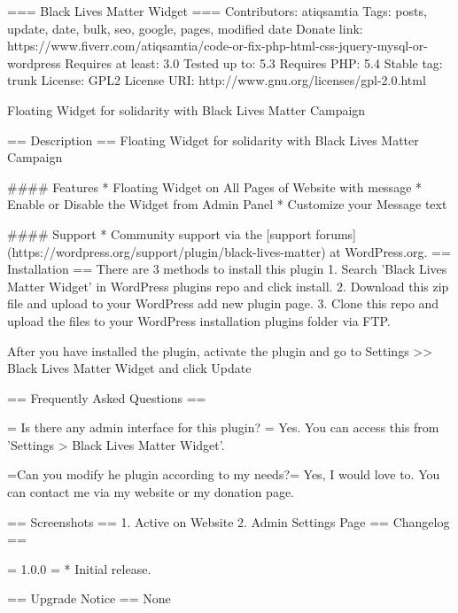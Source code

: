 === Black Lives Matter Widget ===
Contributors: atiqsamtia
Tags: posts, update, date, bulk, seo, google, pages, modified date
Donate link: https://www.fiverr.com/atiqsamtia/code-or-fix-php-html-css-jquery-mysql-or-wordpress
Requires at least: 3.0
Tested up to: 5.3
Requires PHP: 5.4
Stable tag: trunk
License: GPL2
License URI: http://www.gnu.org/licenses/gpl-2.0.html

Floating Widget for solidarity with Black Lives Matter Campaign

== Description ==
Floating Widget for solidarity with Black Lives Matter Campaign

#### Features
* Floating Widget on All Pages of Website with message
* Enable or Disable the Widget from Admin Panel
* Customize your Message text

#### Support
* Community support via the [support forums](https://wordpress.org/support/plugin/black-lives-matter) at WordPress.org.
== Installation ==
There are 3 methods to install this plugin
1. Search 'Black Lives Matter Widget' in WordPress plugins repo and click install.
2. Download this zip file and upload to your WordPress add new plugin page.
3. Clone this repo and upload the files to your WordPress installation plugins folder via FTP.

After you have installed the plugin, activate the plugin and go to Settings >> Black Lives Matter Widget and click Update

== Frequently Asked Questions ==

= Is there any admin interface for this plugin? =
Yes. You can access this from 'Settings > Black Lives Matter Widget'.

=Can you modify he plugin according to my needs?=
Yes, I would love to. You can contact me via my website or my donation page.

== Screenshots ==
1. Active on Website
2. Admin Settings Page
== Changelog ==

= 1.0.0 =
* Initial release.

 == Upgrade Notice ==
None